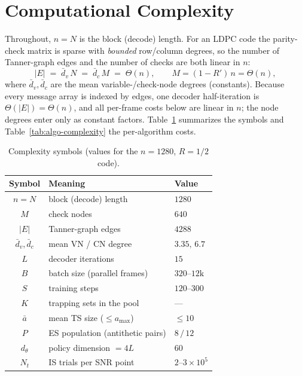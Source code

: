 \section{Computational Complexity}
\label{sec:complexity}

Throughout, $n=N$ is the block (decode) length. For an LDPC code the
parity-check matrix is sparse with \emph{bounded} row/column degrees, so the
number of Tanner-graph edges and the number of checks are both linear in $n$:
\begin{equation}
|E| \;=\; \bar d_v\,N \;=\; \bar d_c\,M \;=\; \Theta(n),
\qquad M=(1-R')\,n=\Theta(n),
\label{eq:sparsity}
\end{equation}
where $\bar d_v,\bar d_c$ are the mean variable-/check-node degrees (constants).
Because every message array is indexed by edges, one decoder half-iteration is
$\Theta(|E|)=\Theta(n)$, and all per-frame costs below are linear in $n$; the
node degrees enter only as constant factors. Table~\ref{tab:complexity}
summarizes the symbols and Table~\ref{tab:algo-complexity} the per-algorithm
costs.

\begin{table}[t]
\centering
\caption{Complexity symbols (values for the $n=1280$, $R=1/2$ code).}
\label{tab:complexity}
\small
\begin{tabular}{@{}cll@{}}
\toprule
Symbol & Meaning & Value \\
\midrule
$n{=}N$        & block (decode) length            & $1280$ \\
$M$            & check nodes                      & $640$ \\
$|E|$          & Tanner-graph edges               & $4288$ \\
$\bar d_v,\bar d_c$ & mean VN / CN degree         & $3.35,\,6.7$ \\
$L$            & decoder iterations               & $15$ \\
$B$            & batch size (parallel frames)     & $320\text{--}12\text{k}$ \\
$S$            & training steps                   & $120\text{--}300$ \\
$K$            & trapping sets in the pool        & --- \\
$\bar a$       & mean TS size ($\le a_{\max}$)     & $\le 10$ \\
$P$            & ES population (antithetic pairs)  & $8\,/\,12$ \\
$d_\theta$     & policy dimension $=4L$           & $60$ \\
$N_t$          & IS trials per SNR point          & $2\text{--}3\times10^{5}$ \\
\bottomrule
\end{tabular}
\end{table}

